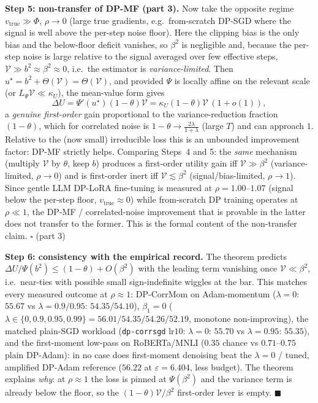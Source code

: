 \par\smallskip\noindent\textbf{Step 5: non-transfer of DP-MF (part 3).}\quad 
Now take the opposite regime $v_{\mathrm{true}}\gg\Phi$, $\rho\to0$ (large true gradients, e.g.\
from-scratch DP-SGD where the signal is well above the per-step noise floor). Here the clipping bias
is the only bias and the below-floor deficit vanishes, so $\beta^2$ is negligible and, because the
per-step noise is large relative to the signal averaged over few effective steps,
$\mathcal V\gg b^2\approx\beta^2\approx0$, i.e.\ the estimator is \emph{variance-limited}. Then
$u^\star=b^2+\Theta(\mathcal V)=\Theta(\mathcal V)$, and provided $\Psi$ is locally affine on the
relevant scale (or $L_\Psi\mathcal V\ll\kappa_U$), the mean-value form gives
\[
\Delta U=\Psi'(u^\star)(1-\theta)\mathcal V=\kappa_U(1-\theta)\mathcal V\,(1+o(1)),
\]
a \emph{genuine first-order} gain proportional to the variance-reduction fraction $(1-\theta)$,
which for correlated noise is $1-\theta\to\tfrac{2\lambda}{1+\lambda}$ (large $T$) and can approach
$1$. Relative to the (now small) irreducible loss this is an unbounded improvement factor:
DP-MF strictly helps. Comparing Steps~4 and 5: the \emph{same} mechanism (multiply $\mathcal V$ by
$\theta$, keep $b$) produces a first-order utility gain iff $\mathcal V\gg\beta^2$ (variance-limited,
$\rho\to0$) and is first-order inert iff $\mathcal V\lesssim\beta^2$ (signal/bias-limited,
$\rho\to1$). Since gentle LLM DP-LoRA fine-tuning is measured at $\rho=1.00$--$1.07$ (signal below
the per-step floor, $v_{\mathrm{true}}\approx0$) while from-scratch DP training operates at
$\rho\ll1$, the DP-MF / correlated-noise improvement that is provable in the latter does not
transfer to the former. This is the formal content of the non-transfer claim. \hfill$\square$ (part 3)

\par\smallskip\noindent\textbf{Step 6: consistency with the empirical record.}\quad 
The theorem predicts $\Delta U/\Psi(b^2)\le(1-\theta)+O(\beta^2)$ with the leading term vanishing
once $\mathcal V\ll\beta^2$, i.e.\ near-ties with possible small sign-indefinite wiggles at the bar.
This matches every measured outcome at $\rho\approx1$: DP-CorrMom on Adam-momentum
($\lambda{=}0$: $55.67$ vs $\lambda{=}0.9/0.95$: $54.35/54.10$), $\beta_1{=}0$
($\lambda\in\{0,0.9,0.95,0.99\}=56.01/54.35/54.26/52.19$, monotone non-improving), the matched
plain-SGD workload (\texttt{dp-corrsgd} lr$10$: $\lambda{=}0$: $55.70$ vs $\lambda{=}0.95$: $55.35$),
and the first-moment low-pass on RoBERTa/MNLI ($0.35$ chance vs $0.71$--$0.75$ plain DP-Adam): in no
case does first-moment denoising beat the $\lambda{=}0$ / tuned, amplified DP-Adam reference
($56.22$ at $\varepsilon{=}6.404$, less budget). The theorem explains \emph{why}: at $\rho\approx1$
the loss is pinned at $\Psi(\beta^2)$ and the variance term is already below the floor, so the
$(1-\theta)\mathcal V/\beta^2$ first-order lever is empty. \hfill$\blacksquare$

